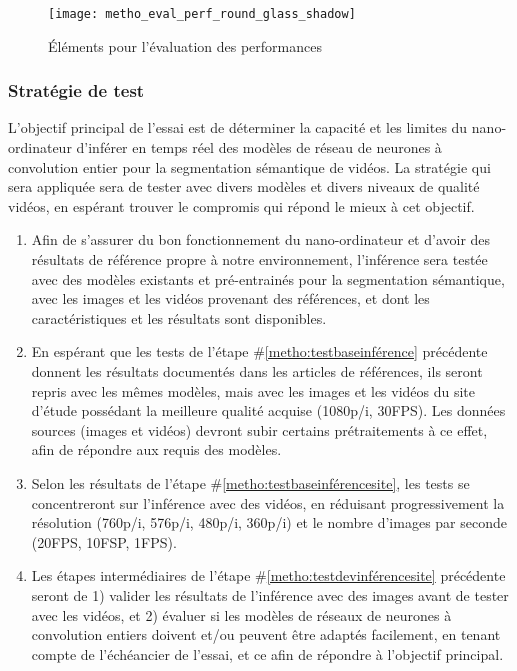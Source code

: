 ﻿\label{metho_eval}
\begin{figure}[H]
    \centering
    \texttt{[image: metho\_eval\_perf\_round\_glass\_shadow]}
    \caption{Éléments pour l'évaluation des performances}
    \label{fig:metho_eval}
\end{figure}

\subsubsection{Stratégie de test}
\par L'objectif principal de l'essai est de déterminer la capacité et les limites du nano-ordinateur d'inférer en temps réel des modèles de réseau de neurones à convolution entier pour la segmentation sémantique de vidéos. La stratégie qui sera appliquée sera de tester avec divers modèles et divers niveaux de qualité vidéos, en espérant trouver le compromis qui répond le mieux à cet objectif.
\begin{enumerate}
   \item \label{metho:testbaseinférence} Afin de s'assurer du bon fonctionnement du nano-ordinateur et d'avoir des résultats de référence propre à notre environnement, l'inférence sera testée avec des modèles existants et pré-entrainés pour la segmentation sémantique, avec les images et les vidéos provenant des références, et dont les caractéristiques et les résultats sont disponibles. 
   \item \label{metho:testbaseinférencesite} En espérant que les tests de l'étape \#\ref{metho:testbaseinférence} précédente donnent les résultats documentés dans les articles de références, ils seront repris avec les mêmes modèles, mais avec les images et les vidéos du site d'étude possédant la meilleure qualité acquise (1080p/i, 30FPS). Les données sources (images et vidéos) devront subir certains prétraitements à ce effet, afin de répondre aux requis des modèles.
   \item \label{metho:testdevinférencesite} Selon les résultats de l'étape \#\ref{metho:testbaseinférencesite}, les tests se concentreront sur l'inférence avec des vidéos, en réduisant progressivement la résolution (760p/i, 576p/i, 480p/i, 360p/i) et le nombre d'images par seconde (20FPS, 10FSP, 1FPS).
   \item Les étapes intermédiaires de l'étape \#\ref{metho:testdevinférencesite} précédente seront de 1) valider les résultats de l'inférence avec des images avant de tester avec les vidéos, et 2) évaluer si les modèles de réseaux de neurones à convolution entiers doivent et/ou peuvent être adaptés facilement, en tenant compte de l'échéancier de l'essai, et ce afin de répondre à l'objectif principal.
\end{enumerate}
